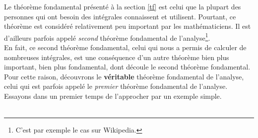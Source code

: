 \documentclass[a4paper,fontsize=13pt]{scrreprt}
\theoremstyle{plain}
\theoremstyle{definition}
\begin{document}
Le théorème fondamental présenté à la section \ref{tf} est celui que la plupart des personnes qui ont besoin des intégrales connaissent et utilisent. Pourtant, ce théorème est considéré relativement peu important par les mathématiciens. Il est d'ailleurs parfois appelé \textit{second} théorème fondamental de l'analyse\footnote{C'est par exemple le cas sur Wikipedia.}. \\
En fait, ce second théorème fondamental, celui qui nous a permis de calculer de nombreuses intégrales, est une conséquence d'un autre théorème bien plus important, bien plus fondamental, dont découle le second théorème fondamental. \\
Pour cette raison, découvrons le \textbf{véritable} théorème fondamental de l'analyse, celui qui est parfois appelé le \textit{premier} théorème fondamental de l'analyse. Essayons dans un premier temps de l'approcher par un exemple simple.\\
~\\
\end{document}
